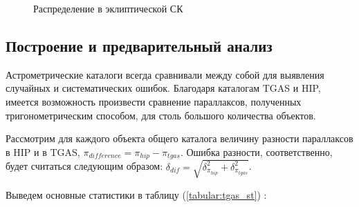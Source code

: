 \documentclass[14pt]{article} %
\begin{document}
\begin{figure}[h!]
\caption{Распределение в эклиптической СК}
\label{img:hiptgaslo}
\end{figure}


\subsection{Построение и предварительный анализ}\label{errvid}

Астрометрические каталоги всегда сравнивали между собой для выявления случайных и систематических ошибок. Благодаря каталогам TGAS и HIP, имеется возможность произвести сравнение параллаксов, полученных тригонометрическим способом, для столь большого количества объектов.

Рассмотрим для каждого объекта общего каталога величину разности параллаксов в HIP и в TGAS, $\pi_{difference} = \pi_{hip} - \pi_{tgas}$. Ошибка разности, соответственно, будет считаться следующим образом: $\delta_{dif} = \sqrt{\delta^2_{\pi_{hip}} + \delta^2_{\pi_{tgas}}}$. 

Выведем основные статистики в таблицу (\ref{tabular:tgas_st}) :
\end{document}
